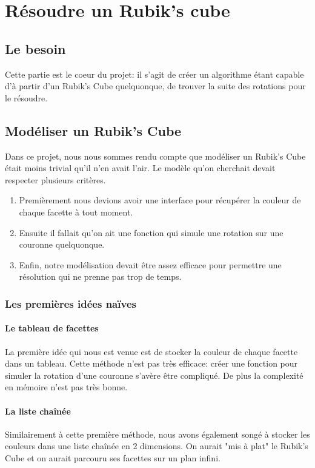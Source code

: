 \chapter{Résoudre un Rubik's cube}

\section{Le besoin}
Cette partie est le coeur du projet: il s'agit de créer un algorithme étant capable d'à partir d'un Rubik's Cube quelquonque, de trouver la suite des rotations pour le résoudre.

\section{Modéliser un Rubik's Cube}

Dans ce projet, nous nous sommes rendu compte que modéliser un Rubik's Cube était moins trivial qu'il n'en avait l'air.
Le modèle qu'on cherchait devait respecter plusieurs critères. 
\begin{enumerate}
    \item Premièrement nous devions avoir une interface pour récupérer la couleur de chaque facette à tout moment.
    \item Ensuite il fallait qu'on ait une fonction qui simule une rotation sur une couronne quelquonque.
    \item Enfin, notre modélisation devait être assez efficace pour permettre une résolution qui ne prenne pas trop de temps.
\end{enumerate}
\subsection{Les premières idées naïves}

\subsubsection{Le tableau de facettes}
La première idée qui nous est venue est de stocker la couleur de chaque facette dans un tableau.
Cette méthode n'est pas très efficace: créer une fonction pour simuler la rotation d'une couronne s'avère être compliqué.
De plus la complexité en mémoire n'est pas très bonne.

\subsubsection{La liste chaînée}
Similairement à cette première méthode, nous avons également songé à stocker les couleurs dans une liste chaînée en 2 dimensions.
On aurait "mis à plat" le Rubik's Cube et on aurait parcouru ses facettes sur un plan infini.

